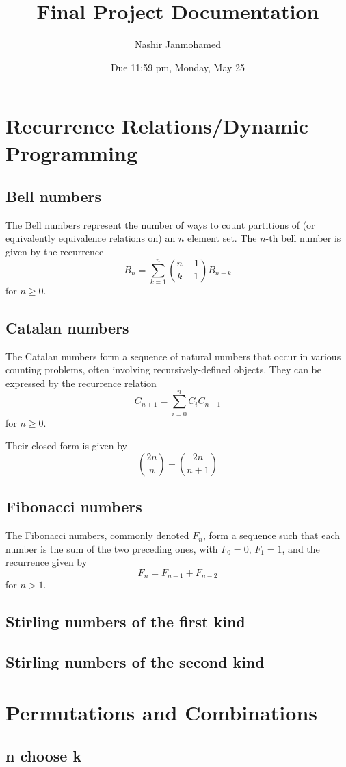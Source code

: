 \documentclass{article}
\title{Final Project Documentation}
\author{Nashir Janmohamed}
\date{Due 11:59 pm, Monday, May 25}
\begin{document}
\maketitle


\section{Recurrence Relations/Dynamic Programming}
\subsection{Bell numbers}
The Bell numbers represent the number of ways to count partitions of (or equivalently equivalence relations on) an $n$ element set. The $n$-th bell number is given by the recurrence
\[B_n = \sum_{k=1}^{n} {n-1 \choose k-1} B_{n-k}\]
for $n \ge 0$.
\subsection{Catalan numbers}
The Catalan numbers form a sequence of natural numbers that occur in various counting problems, often involving recursively-defined objects. They can be expressed by the recurrence relation
\[C_{n+1} = \sum_{i=0}^{n}C_iC_{n-1}\]
for $n \ge 0$.

\noindent Their closed form is given by
\[{2n \choose n} - {2n \choose n+1 }\]
\subsection{Fibonacci numbers}
The Fibonacci numbers, commonly denoted $F_n$, form a sequence such that each number is the sum of the two preceding ones, with $F_0 = 0$, $F_1 = 1$, and the recurrence given by
\[F_n = F_{n-1}+F_{n-2}\]
for $n > 1$.
\subsection{Stirling numbers of the first kind}
\subsection{Stirling numbers of the second kind}

\section{Permutations and Combinations}
\subsection{n choose k}
\end{document}
